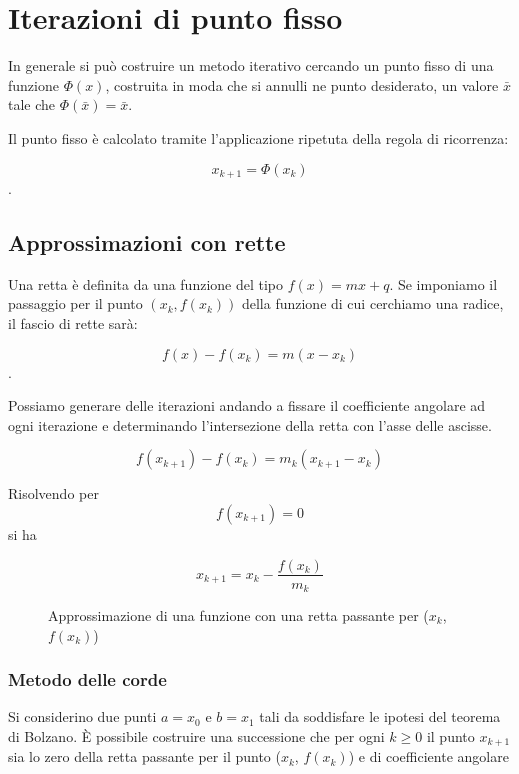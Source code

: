 \documentclass[10pt]{article}
\begin{document}
\section{Iterazioni di punto fisso}

In generale si può costruire un metodo iterativo cercando un punto fisso di una funzione $\Phi(x)$,
costruita in moda che si annulli ne punto desiderato, un valore $\bar{x}$ tale che $\Phi(\bar{x}) = \bar{x}$.

Il punto fisso è calcolato tramite l'applicazione ripetuta della regola di ricorrenza:

$$x_{k+1} = \Phi(x_k)$$.

\subsection{Approssimazioni con rette}

Una retta è definita da una funzione del tipo $f(x) = m x + q$.
Se imponiamo il passaggio per il punto $(x_k, f(x_k))$ della funzione di cui cerchiamo una radice, il fascio di rette sarà:

$$f(x) - f(x_k) = m (x - x_k)$$.

Possiamo generare delle iterazioni andando a fissare il coefficiente angolare ad ogni iterazione e determinando l'intersezione della retta con l'asse delle ascisse.

$$f(x_{k+1}) - f(x_k) = m_k (x_{k+1} - x_k)$$

Risolvendo per $$f(x_{k+1}) = 0$$ si ha

\begin{equation}
    x_{k+1} = x_k - \frac{f(x_k)}{m_k}
\end{equation}

\begin{figure}
    \begin{center}
        
        \caption{Approssimazione di una funzione con una retta passante per ($x_k$, $f(x_k)$)}
        \label{fig:retta_approx}
    \end{center}
\end{figure}


\subsubsection{Metodo delle corde}

Si considerino due punti $a=x_0$ e $b=x_1$ tali da soddisfare le ipotesi del teorema di Bolzano.
È possibile costruire una successione che per ogni $k \geq 0$  il punto $x_{k+1}$ sia lo zero della retta passante per il punto
($x_{k}$, $f(x_{k})$) e di coefficiente angolare
\end{document}
